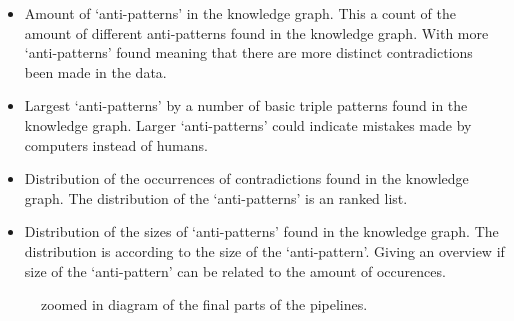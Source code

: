 \documentclass[11pt,letterpaper ,oneside ]{book}
\begin{document}
	\begin{itemize}
		\item Amount of `anti-patterns' in the knowledge graph. This a count of the amount of different anti-patterns found in the knowledge graph. With more `anti-patterns' found meaning that there are more distinct contradictions been made in the data.
		\item Largest `anti-patterns' by a number of basic triple patterns found in the knowledge graph. Larger `anti-patterns' could indicate mistakes made by computers instead of humans.
		\item Distribution of the occurrences of contradictions found in the knowledge graph. The distribution of the `anti-patterns' is an ranked list. 
		\item Distribution of the sizes of `anti-patterns' found in the knowledge graph. The distribution is according to the size of the `anti-pattern'. Giving an overview if size of the `anti-pattern' can be related to the amount of occurences.
	\end{itemize} 
	\begin{figure}[!t]
		\hfill
		\caption{zoomed in diagram of the final parts of the pipelines.}
		\label{fig:PipelinePart45}
	\end{figure}
	
\end{document}
